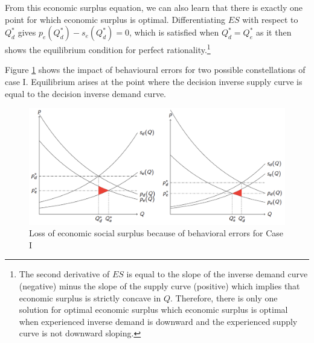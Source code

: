 \documentclass[
]{book}
\begin{document}
From this economic surplus equation, we can also learn that there is exactly one point for which economic surplus is optimal. Differentiating \(ES\) with respect to \(Q_d^*\) gives \(p_e (Q_d^*)-s_e (Q_d^*)=0\), which is satisfied when \(Q_d^* = Q_e^*\) as it then shows the equilibrium condition for perfect rationality.\footnote{The second derivative of \(ES\) is equal to the slope of the inverse demand curve (negative) minus the slope of the supply curve (positive) which implies that economic surplus is strictly concave in \(Q\). Therefore, there is only one solution for optimal economic surplus which economic surplus is optimal when experienced inverse demand is downward and the experienced supply curve is not downward sloping.}

Figure \ref{fig:losssurplus} shows the impact of behavioural errors for two possible constellations of case I. Equilibrium arises at the point where the decision inverse supply curve is equal to the decision inverse demand curve.

\begin{figure}
\includegraphics[width=17.03in]{./figures/losssurplus} \caption{Loss of economic social surplus because of behavioral errors for Case I}\label{fig:losssurplus}
\end{figure}
\end{document}
